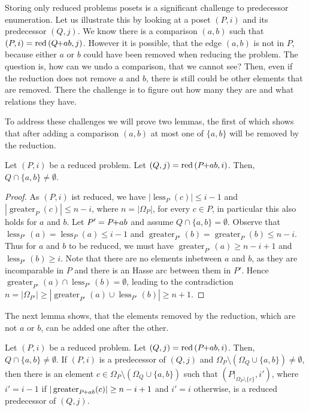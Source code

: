 \documentclass[twoside,leqno,twocolumn]{article}
\newcommand{\pchild}[3]{{#1}\kern-1pt{+}{#2}{#3}}
\newcommand{\reduced}[1]{\operatorname{red}{#1}}
\newcommand{\less}[2]{\operatorname{less}_{#1}(#2)}
\newcommand{\greater}[2]{\operatorname{greater}_{#1}(#2)}
\begin{document}
Storing only reduced problems posets is a significant challenge to predecessor enumeration.
Let us illustrate this by looking at a poset $(P, i)$ and its predecessor $(Q, j)$.
We know there is a comparison $(a, b)$ such that $(P, i) = \reduced(\pchild{Q}{a}{b}, j)$.
However it is possible, that the edge $(a, b)$ is not in $P$, because either $a$ or $b$ could have been removed when reducing the problem.
The question is, how can we undo a comparison, that we cannot see?
Then, even if the reduction does not remove $a$ and $b$, there is still could be other elements that are removed.
There the challenge is to figure out how many they are and what relations they have.

To address these challenges we will prove two lemmas, the first of which shows that after adding a comparison $(a, b)$ at most one of $\{a, b\}$ will be removed by the reduction.

\begin{lemma} \label{lemma:remove_only_last_element_edge}
  Let $(P, i)$ be a reduced problem.
  Let $(Q, j) = \reduced{(\pchild{P}{a}{b}, i)}$.
  Then, $Q \cap \{a ,b \} \neq \emptyset$.
\end{lemma}

\begin{proof}
  As $(P, i)$ ist reduced, we have $|\less{P}{c}| \le i - 1$ and $|\greater{P}{c}| \le n - i$, where $n = |\Omega_P|$, for every $c \in P$, in particular this also holds for $a$ and $b$.
  Let $P' = \pchild{P}{a}{b}$ and assume $Q \cap \{a ,b \} = \emptyset$.
  Observe that $\less{P'}{a} = \less{P}{a} \le i-1$ and $\greater{P'}{b} = \greater{P}{b} \le n - i$.
  Thus for $a$ and $b$ to be reduced, we must have $\greater{P'}{a} \ge n - i + 1$ and $\less{P'}{b} \ge i$.
  Note that there are no elements inbetween $a$ and $b$, as they are incomparable in $P$ and there is an Hasse arc between them in $P'$.
  Hence $\greater{P'}{a} \cap \less{P'}{b} = \emptyset$, leading to the contradiction $n = |\Omega_{P'}| \ge |\greater{P'}{a} \cup \less{P'}{b}| \ge n + 1$.
\end{proof}

The next lemma shows, that the elements removed by the reduction, which are not $a$ or $b$, can be added one after the other.

\begin{lemma}\label{lemma:remove_elements_iteratively}
  Let $(P, i)$ be a reduced problem.
  Let $(Q, j) = \reduced{(\pchild{P}{a}{b}, i)}$.
  Then, $Q \cap \{a, b\} \neq \emptyset$.
  If $(P, i)$ is a predecessor of $(Q, j)$ and $\Omega_P \setminus (\Omega_Q \cup \{a, b\}) \neq \emptyset$, then there is an element $c \in \Omega_P \setminus (\Omega_Q \cup \{a, b\})$ such that $(P|_{\Omega_P \setminus \{c\}}, i')$, where $i' = i - 1$ if $|\greater{\pchild{P}{a}{b}}{c}| \ge n-i+1$ and $i'=i$ otherwise, is a reduced predecessor of $(Q, j)$.
\end{lemma}
\end{document}
